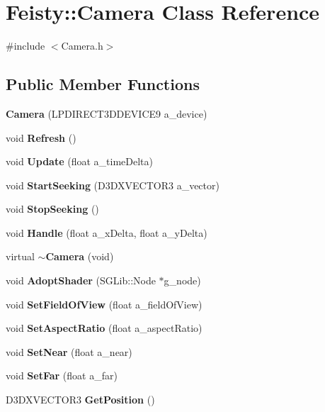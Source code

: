 \section{Feisty::Camera Class Reference}
\label{class_feisty_1_1_camera}


{\ttfamily \#include $<$Camera.h$>$}\subsection*{Public Member Functions}
\begin{DoxyCompactItemize}
\item 
{\bf Camera} (LPDIRECT3DDEVICE9 a\_\-device)
\item 
void {\bf Refresh} ()
\item 
void {\bf Update} (float a\_\-timeDelta)
\item 
void {\bf StartSeeking} (D3DXVECTOR3 a\_\-vector)
\item 
void {\bf StopSeeking} ()
\item 
void {\bf Handle} (float a\_\-xDelta, float a\_\-yDelta)
\item 
virtual {\bf $\sim$Camera} (void)
\item 
void {\bf AdoptShader} (SGLib::Node $\ast$g\_\-node)
\item 
void {\bf SetFieldOfView} (float a\_\-fieldOfView)
\item 
void {\bf SetAspectRatio} (float a\_\-aspectRatio)
\item 
void {\bf SetNear} (float a\_\-near)
\item 
void {\bf SetFar} (float a\_\-far)
\item 
D3DXVECTOR3 {\bf GetPosition} ()
\end{DoxyCompactItemize}
